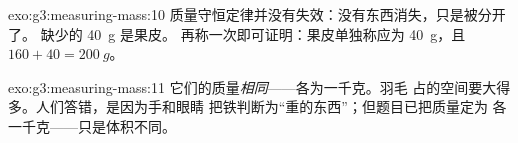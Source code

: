 \begin{solution}{exo:g3:measuring-mass:10}
质量守恒定律并没有失效：没有东西消失，只是被分开了。
缺少的 \qty{40}{g} 是果皮。
再称一次即可证明：果皮单独称应为 \qty{40}{g}，且 $160 + 40 =
\qty{200}{g}$。
\end{solution}

\begin{solution}{exo:g3:measuring-mass:11}
它们的质量\emph{相同}——各为一千克。羽毛
占的空间要大得多。人们答错，是因为手和眼睛
把铁判断为“重的东西”；但题目已把质量定为
各一千克——只是体积不同。
\end{solution}
